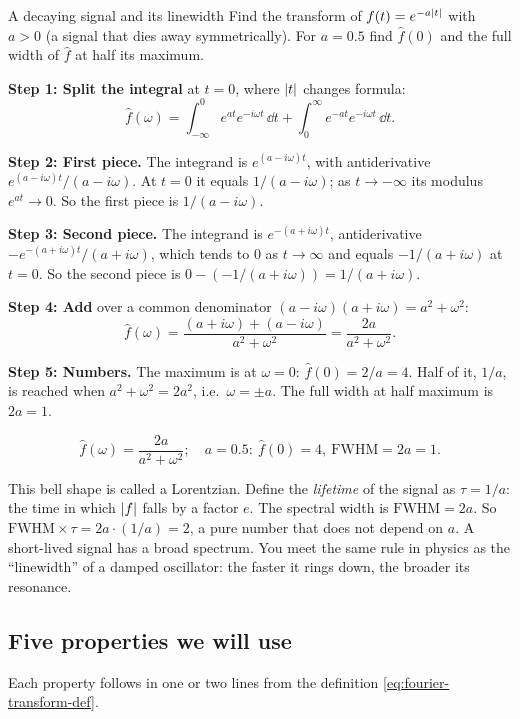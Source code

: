 \begin{sample}{A decaying signal and its linewidth}
Find the transform of $f(t)=e^{-a\left\lvert t\right\rvert}$ with $a>0$ (a signal that dies away symmetrically). For $a=0.5$ find $\hat f(0)$ and the full width of $\hat f$ at half its maximum.

\textbf{Step 1: Split the integral} at $t=0$, where $\left\lvert t\right\rvert$ changes formula:
\[\hat f(\omega)=\int_{-\infty}^{0}e^{at}e^{-i\omega t}\,\dd t+\int_{0}^{\infty}e^{-at}e^{-i\omega t}\,\dd t .\]

\textbf{Step 2: First piece.} The integrand is $e^{(a-i\omega)t}$, with antiderivative $e^{(a-i\omega)t}/(a-i\omega)$. At $t=0$ it equals $1/(a-i\omega)$; as $t\to-\infty$ its modulus $e^{at}\to0$. So the first piece is $1/(a-i\omega)$.

\textbf{Step 3: Second piece.} The integrand is $e^{-(a+i\omega)t}$, antiderivative $-e^{-(a+i\omega)t}/(a+i\omega)$, which tends to $0$ as $t\to\infty$ and equals $-1/(a+i\omega)$ at $t=0$. So the second piece is $0-(-1/(a+i\omega))=1/(a+i\omega)$.

\textbf{Step 4: Add} over a common denominator $(a-i\omega)(a+i\omega)=a^2+\omega^2$:
\[\hat f(\omega)=\frac{(a+i\omega)+(a-i\omega)}{a^2+\omega^2}=\frac{2a}{a^2+\omega^2}.\]

\textbf{Step 5: Numbers.} The maximum is at $\omega=0$: $\hat f(0)=2/a=4$. Half of it, $1/a$, is reached when $a^2+\omega^2=2a^2$, i.e.\ $\omega=\pm a$. The full width at half maximum is $2a=1$.

\[\boxed{\hat f(\omega)=\frac{2a}{a^2+\omega^2};\quad a=0.5:\ \hat f(0)=4,\ \text{FWHM}=2a=1.}\]
\end{sample}

This bell shape is called a Lorentzian. Define the \emph{lifetime} of the signal as $\tau=1/a$: the time in which $\left\lvert f\right\rvert$ falls by a factor $e$. The spectral width is $\text{FWHM}=2a$. So $\text{FWHM}\times\tau=2a\cdot(1/a)=2$, a pure number that does not depend on $a$. A short-lived signal has a broad spectrum. You meet the same rule in physics as the ``linewidth'' of a damped oscillator: the faster it rings down, the broader its resonance.

\subsection{Five properties we will use}

Each property follows in one or two lines from the definition \eqref{eq:fourier-transform-def}.

